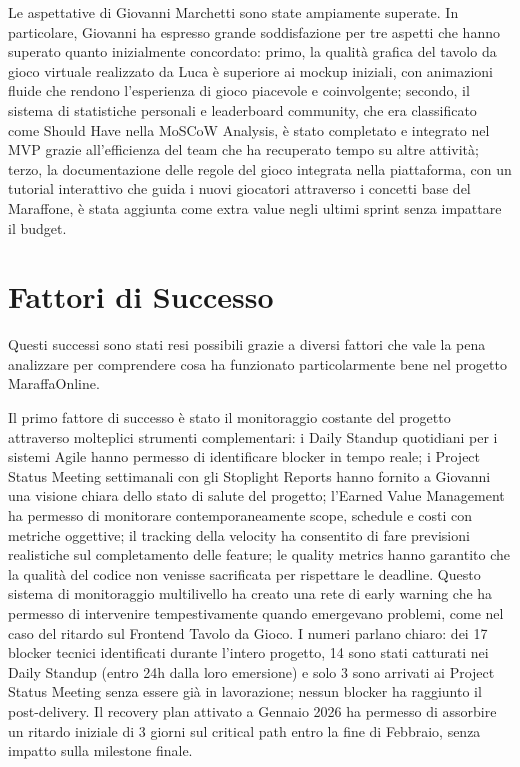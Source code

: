 Le aspettative di Giovanni Marchetti sono state ampiamente superate. In particolare, Giovanni ha espresso grande soddisfazione per tre aspetti che hanno superato quanto inizialmente concordato: primo, la qualità grafica del tavolo da gioco virtuale realizzato da Luca è superiore ai mockup iniziali, con animazioni fluide che rendono l'esperienza di gioco piacevole e coinvolgente; secondo, il sistema di statistiche personali e leaderboard community, che era classificato come Should Have nella MoSCoW Analysis, è stato completato e integrato nel MVP grazie all'efficienza del team che ha recuperato tempo su altre attività; terzo, la documentazione delle regole del gioco integrata nella piattaforma, con un tutorial interattivo che guida i nuovi giocatori attraverso i concetti base del Maraffone, è stata aggiunta come extra value negli ultimi sprint senza impattare il budget.

\section{Fattori di Successo}

Questi successi sono stati resi possibili grazie a diversi fattori che vale la pena analizzare per comprendere cosa ha funzionato particolarmente bene nel progetto MaraffaOnline.

Il primo fattore di successo è stato il monitoraggio costante del progetto attraverso molteplici strumenti complementari: i Daily Standup quotidiani per i sistemi Agile hanno permesso di identificare blocker in tempo reale; i Project Status Meeting settimanali con gli Stoplight Reports hanno fornito a Giovanni una visione chiara dello stato di salute del progetto; l'Earned Value Management ha permesso di monitorare contemporaneamente scope, schedule e costi con metriche oggettive; il tracking della velocity ha consentito di fare previsioni realistiche sul completamento delle feature; le quality metrics hanno garantito che la qualità del codice non venisse sacrificata per rispettare le deadline. Questo sistema di monitoraggio multilivello ha creato una rete di early warning che ha permesso di intervenire tempestivamente quando emergevano problemi, come nel caso del ritardo sul Frontend Tavolo da Gioco. I numeri parlano chiaro: dei 17 blocker tecnici identificati durante l'intero progetto, 14 sono stati catturati nei Daily Standup (entro 24h dalla loro emersione) e solo 3 sono arrivati ai Project Status Meeting senza essere già in lavorazione; nessun blocker ha raggiunto il post-delivery. Il recovery plan attivato a Gennaio 2026 ha permesso di assorbire un ritardo iniziale di 3 giorni sul critical path entro la fine di Febbraio, senza impatto sulla milestone finale.

